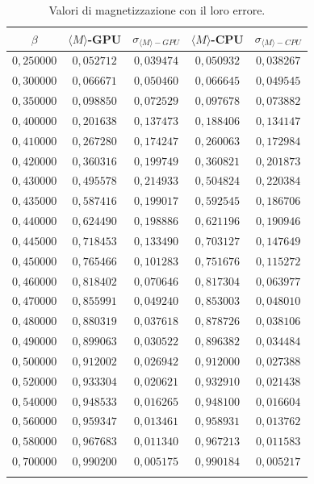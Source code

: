\documentclass[a4paper,12pt]{article}
\begin{document}
\begin{table}
\begin{center}
\begin {tabular}{c|c|c|c|c}
\hline
\hline
$\beta$ & $\langle  M \rangle$-GPU & $\sigma_{\langle  M \rangle-GPU}$ & $\langle  M \rangle$-CPU & $\sigma_{\langle  M \rangle-CPU}$        \\
\hline
$0,250000$ &    $0,052712$   &     $0,039474$ &  $0,050932$  &  $0,038267$\\
$0,300000$ &     $0,066671$     &   $0,050460$ &  $0,066645$  &  $0,049545$\\
$0,350000$ &      $0,098850$    &    $0,072529$ &  $0,097678$  &  $0,073882$\\
$0,400000$ &      $0,201638$   &     $0,137473$  &  $0,188406$  &  $0,134147$\\
$0,410000$ &       $0,267280$   &     $0,174247$  &  $0,260063$  &  $0,172984$\\
$0,420000$ &       $0,360316$   &     $0,199749$  &  $0,360821$  &  $0,201873$\\
$0,430000$ &       $0,495578$   &     $0,214933$  &  $0,504824$  &  $0,220384$\\
$0,435000$ &       $0,587416$   &     $0,199017$  &  $0,592545$  &  $0,186706$\\
$0,440000$ &       $0,624490$   &     $0,198886$  &  $0,621196$  &  $0,190946$\\
$0,445000$ &       $0,718453$   &     $0,133490$  &  $0,703127$  &  $0,147649$\\
$0,450000$ &       $0,765466$   &     $0,101283$  &  $0,751676$  &  $0,115272$\\
$0,460000$ &       $0,818402$   &     $0,070646$  &  $0,817304$  &  $0,063977$\\
$0,470000$ &       $0,855991$   &     $0,049240$  &  $0,853003$  &  $0,048010$\\
$0,480000$ &       $0,880319$   &     $0,037618$  &  $0,878726$  &  $0,038106$\\
$0,490000$ &       $0,899063$   &     $0,030522$  &  $0,896382$  &  $0,034484$\\
$0,500000$ &       $0,912002$   &     $0,026942$  &  $0,912000$  &  $0,027388$\\
$0,520000$ &       $0,933304$   &     $0,020621$  &  $0,932910$  &  $0,021438$\\
$0,540000$ &       $0,948533$   &     $0,016265$  &  $0,948100$  &  $0,016604$\\
$0,560000$ &       $0,959347$   &     $0,013461$  &  $0,958931$  &  $0,013762$\\
$0,580000$ &       $0,967683$   &     $0,011340$  &  $0,967213$  &  $0,011583$\\
$0,700000$ &       $0,990200$   &     $0,005175$  &  $0,990184$  &  $0,005217$\\
\\
\hline
\hline
\end{tabular}
\end{center}
\caption{\label{tab:mag}
	Valori di magnetizzazione con il loro errore.
}
\end{table}
\end{document}
